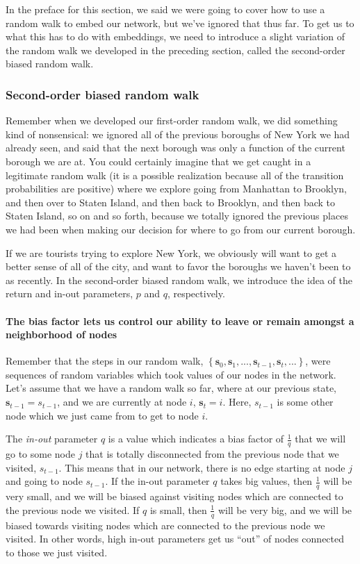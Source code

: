 In the preface for this section, we said we were going to cover how to use a random walk to embed our network, but we've ignored that thus far. To get us to what this has to do with embeddings, we need to introduce a slight variation of the random walk we developed in the preceding section, called the second-order biased random walk.
\subsubsection*{Second-order biased random walk}

Remember when we developed our first-order random walk, we did something kind of nonsensical: we ignored all of the previous boroughs of New York we had already seen, and said that the next borough was only a function of the current borough we are at. You could certainly imagine that we get caught in a legitimate random walk (it is a possible realization because all of the transition probabilities are positive) where we explore going from Manhattan to Brooklyn, and then over to Staten Island, and then back to Brooklyn, and then back to Staten Island, so on and so forth, because we totally ignored the previous places we had been when making our decision for where to go from our current borough. 

If we are tourists trying to explore New York, we obviously will want to get a better sense of all of the city, and want to favor the boroughs we haven't been to as recently. In the second-order biased random walk, we introduce the idea of the return and in-out parameters, $p$ and $q$, respectively. 

\paragraph*{The bias factor lets us control our ability to leave or remain amongst a neighborhood of nodes}

Remember that the steps in our random walk, $\left\{\mathbf s_0, \mathbf s_1, ..., \mathbf s_{t-1}, \mathbf s_t, ...\right\}$, were sequences of random variables which took values of our nodes in the network. Let's assume that we have a random walk so far, where at our previous state, $\mathbf s_{t-1} = s_{t-1}$, and we are currently at node $i$, $\mathbf s_t = i$. Here, $s_{t-1}$ is some other node which we just came from to get to node $i$.

The \textit{in-out} parameter $q$ is a value which indicates a bias factor of $\frac{1}{q}$ that we will go to some node $j$ that is totally disconnected from the previous node that we visited, $s_{t-1}$. This means that in our network, there is no edge starting at node $j$ and going to node $s_{t-1}$. If the in-out parameter $q$ takes big values, then $\frac{1}{q}$ will be very small, and we will be biased against visiting nodes which are connected to the previous node we visited. If $q$ is small, then $\frac{1}{q}$ will be very big, and we will be biased towards visiting nodes which are connected to the previous node we visited. In other words, high in-out parameters get us ``out'' of nodes connected to those we just visited.

